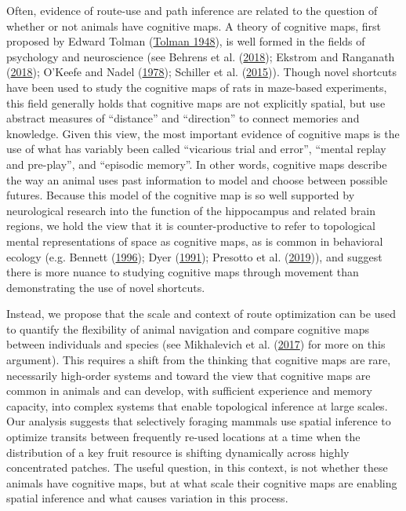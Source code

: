 \documentclass[twoside,12pt,final]{ucthesis-CA2012}
\begin{document}
\begin{ucmainmatter}
Often, evidence of route-use and path inference are related to the question of whether or not animals have cognitive maps. A theory of cognitive maps, first proposed by Edward Tolman (\protect\hyperlink{ref-tolman1948}{Tolman 1948}), is well formed in the fields of psychology and neuroscience (see Behrens et al. (\protect\hyperlink{ref-behrens2018}{2018}); Ekstrom and Ranganath (\protect\hyperlink{ref-ekstrom2018}{2018}); O'Keefe and Nadel (\protect\hyperlink{ref-okeefe1978}{1978}); Schiller et al. (\protect\hyperlink{ref-schiller2015}{2015})). Though novel shortcuts have been used to study the cognitive maps of rats in maze-based experiments, this field generally holds that cognitive maps are not explicitly spatial, but use abstract measures of ``distance'' and ``direction'' to connect memories and knowledge. Given this view, the most important evidence of cognitive maps is the use of what has variably been called ``vicarious trial and error'', ``mental replay and pre-play'', and ``episodic memory''. In other words, cognitive maps describe the way an animal uses past information to model and choose between possible futures. Because this model of the cognitive map is so well supported by neurological research into the function of the hippocampus and related brain regions, we hold the view that it is counter-productive to refer to topological mental representations of space as cognitive maps, as is common in behavioral ecology (e.g. Bennett (\protect\hyperlink{ref-bennett1996}{1996}); Dyer (\protect\hyperlink{ref-dyer1991}{1991}); Presotto et al. (\protect\hyperlink{ref-presotto2019a}{2019})), and suggest there is more nuance to studying cognitive maps through movement than demonstrating the use of novel shortcuts.

Instead, we propose that the scale and context of route optimization can be used to quantify the flexibility of animal navigation and compare cognitive maps between individuals and species (see Mikhalevich et al. (\protect\hyperlink{ref-mikhalevich2017}{2017}) for more on this argument). This requires a shift from the thinking that cognitive maps are rare, necessarily high-order systems and toward the view that cognitive maps are common in animals and can develop, with sufficient experience and memory capacity, into complex systems that enable topological inference at large scales. Our analysis suggests that selectively foraging mammals use spatial inference to optimize transits between frequently re-used locations at a time when the distribution of a key fruit resource is shifting dynamically across highly concentrated patches. The useful question, in this context, is not whether these animals have cognitive maps, but at what scale their cognitive maps are enabling spatial inference and what causes variation in this process.


\end{ucmainmatter}
\end{document}
